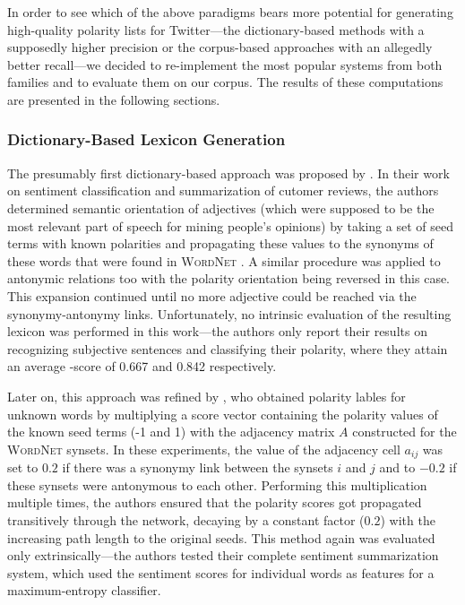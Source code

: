 In order to see which of the above paradigms bears more potential for
generating high-quality polarity lists for Twitter---the
dictionary-based methods with a supposedly higher precision or the
corpus-based approaches with an allegedly better recall---we decided
to re-implement the most popular systems from both families and to
evaluate them on our corpus.  The results of these computations are
presented in the following sections.

\subsubsection{Dictionary-Based Lexicon Generation}

The presumably first dictionary-based approach was proposed by
\citet{Hu:04}.  In their work on sentiment classification and
summarization of cutomer reviews, the authors determined semantic
orientation of adjectives (which were supposed to be the most relevant
part of speech for mining people's opinions) by taking a set of seed
terms with known polarities and propagating these values to the
synonyms of these words that were found in \textsc{WordNet}
\cite{Miller:95}.  A similar procedure was applied to antonymic
relations too with the polarity orientation being reversed in this
case.  This expansion continued until no more adjective could be
reached via the synonymy-antonymy links.  Unfortunately, no intrinsic
evaluation of the resulting lexicon was performed in this work---the
authors only report their results on recognizing subjective sentences
and classifying their polarity, where they attain an average \F-score
of 0.667 and 0.842 respectively.

Later on, this approach was refined by \citet{Blair-Goldensohn:08},
who obtained polarity lables for unknown words by multiplying a score
vector containing the polarity values of the known seed terms (-1 and
1) with the adjacency matrix $A$ constructed for the \textsc{WordNet}
synsets.  In these experiments, the value of the adjacency cell
$a_{ij}$ was set to $0.2$ if there was a synonymy link between the
synsets $i$ and $j$ and to $-0.2$ if these synsets were antonymous to
each other.  Performing this multiplication multiple times, the
authors ensured that the polarity scores got propagated transitively
through the network, decaying by a constant factor ($0.2$) with the
increasing path length to the original seeds.  This method again was
evaluated only extrinsically---the authors tested their complete
sentiment summarization system, which used the sentiment scores for
individual words as features for a maximum-entropy classifier.

